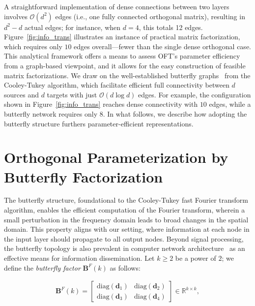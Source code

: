 A straightforward implementation of dense connections between two layers involves $\mathcal{O}(d^2)$ edges (i.e., one fully connected orthogonal matrix), resulting in $d^2 - d$ actual edges; for instance, when $d=4$, this totals 12 edges. Figure~\ref{fig:info_trans} illustrates an instance of practical matrix factorization, which requires only $10$ edges overall—fewer than the single dense orthogonal case. This analytical framework offers a means to assess OFT's parameter efficiency from a graph-based viewpoint, and it allows for the easy construction of feasible matrix factorizations. We draw on the well-established butterfly graphs~\cite{cooley1965algorithm} from the Cooley-Tukey algorithm, which facilitate efficient full connectivity between $d$ sources and $d$ targets with just $\mathcal{O}(d \log d)$ edges. For example, the configuration shown in Figure~\ref{fig:info_trans} reaches dense connectivity with $10$ edges, while a butterfly network requires only $8$. In what follows, we describe how adopting the butterfly structure furthers parameter-efficient representations.

\section{Orthogonal Parameterization by Butterfly Factorization}

The butterfly structure, foundational to the Cooley-Tukey fast Fourier transform algorithm, enables the efficient computation of the Fourier transform, wherein a small perturbation in the frequency domain leads to broad changes in the spatial domain. This property aligns with our setting, where information at each node in the input layer should propagate to all output nodes. Beyond signal processing, the butterfly topology is also prevalent in computer network architecture~\cite{solihin2015fundamentals,li2011linear} as an effective means for information dissemination. Let $k \geq 2$ be a power of $2$; we define the \emph{butterfly factor} $\bm{B}^F(k)$ as follows:

\begin{equation}\label{eq:but_factor}
\begin{aligned}
    \bm{B}^F(k)=\begin{bmatrix}
    \text{diag}(\bm{d}_1) & \text{diag}(\bm{d}_2) \\
    \text{diag}(\bm{d}_3) & \text{diag}(\bm{d}_4)
    \end{bmatrix}\in\mathbb{R}^{k\times k},
\end{aligned}
\end{equation}

